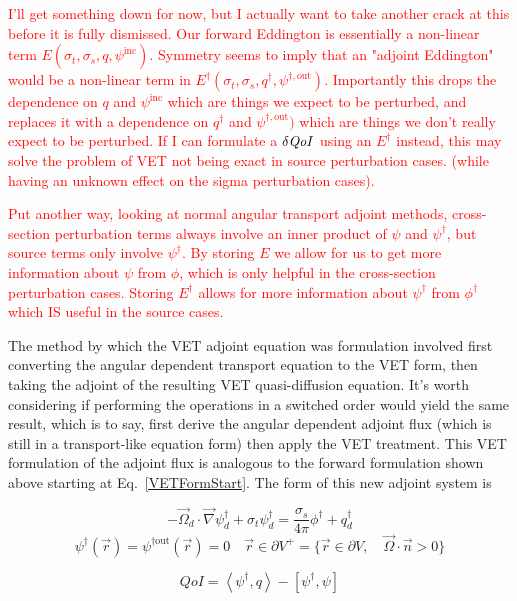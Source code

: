 \documentclass[12pt]{report}
\newcommand{\vr}{\vec{r}}
\newcommand{\vO}{\vec{\Omega}}
\newcommand{\bra}{\left\langle}
\newcommand{\ket}{\right\rangle}
\newcommand{\sbra}{\left[}
\newcommand{\sket}{\right]}
\newcommand{\grad}{\vec{\nabla}}
\newcommand{\bound}{\partial V}
\newcommand{\sigt}{\sigma_t}
\newcommand{\sigs}{\sigma_s}
\newcommand{\angSource}{q}
\newcommand{\angResp}{q^\dag}
\newcommand{\qoi}{{\it QoI}\xspace}
\newcommand{\comment}[2]{\marginpar{\textcolor{#2}{$\star$}}\textcolor{#2}{#1}\newline}
\newcommand{\iwh}[1]{\comment{#1}{red}}
\newcommand{\iwh}[1]{\phantom{a}}
\begin{document}
\iwh{I'll get something down for now, but I actually want to take another crack at this before it is fully dismissed. Our forward Eddington is essentially a non-linear term $E(\sigt,\sigs,q,\psi^{\text{inc}})$. Symmetry seems to imply that an "adjoint Eddington" would be a non-linear term in $E^\dag(\sigt,\sigs,q^\dag,\psi^{\dag,\text{out}})$. Importantly this drops the dependence on $q$ and $\psi^{\text{inc}}$ which are things we expect to be perturbed, and replaces it with a dependence on $q^\dag$ and $\psi^{\dag,\text{out}})$ which are things we don't really expect to be perturbed. If I can formulate a $\delta \qoi$ using an $E^\dag$ instead, this may solve the problem of VET not being exact in source perturbation cases. (while having an unknown effect on the sigma perturbation cases).}


\iwh{Put another way, looking at normal angular transport adjoint methods, cross-section perturbation terms always involve an inner product of $\psi$ and $\psi^\dag$, but source terms only involve $\psi^\dag$. By storing $E$ we allow for us to get more information about $\psi$ from $\phi$, which is only helpful in the cross-section perturbation cases. Storing $E^\dag$ allows for more information about $\psi^\dag$ from $\phi^\dag$ which IS useful in the source cases.}

The method by which the VET adjoint equation was formulation involved first converting the angular dependent transport equation to the VET form, then taking the adjoint of the resulting VET quasi-diffusion equation. It's worth considering if performing the operations in a switched order would yield the same result, which is to say, first derive the angular dependent adjoint flux (which is still in a transport-like equation form) then apply the VET treatment. This VET formulation of the adjoint flux is analogous to the forward formulation shown above starting at   Eq.~\eqref{VETFormStart}. The form of this new adjoint system is

\begin{equation}
\label{snAdjAlt}
- \vO_d \cdot \grad \psi^\dag_d + \sigt \psi^\dag_d = \frac{\sigs}{4 \pi} \phi^\dag + \angResp_d
\end{equation}
%
\begin{equation}
\psi^\dag(\vr) = \psi^{\dag \text{out}}(\vr)=0 \quad \vr \in \partial V^{+} = \{  \vr \in \bound , \quad \vO \cdot \vec{n} > 0 \}
\end{equation}

\begin{equation}
\label{snAdjQoIAlt}
QoI = \bra \psi^\dag , \angSource \ket - \sbra \psi^\dag,  \psi \sket
\end{equation}
\end{document}
